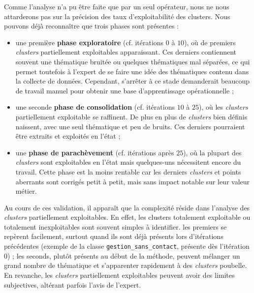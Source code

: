 			Comme l'analyse n'a pu être faite que par un seul opérateur, nous ne nous attarderons pas sur la précision des taux d'exploitabilité des clusters.
			Nous pouvons déjà reconnaître que trois phases sont présentes :
			\begin{itemize}
				\item une première \textbf{phase exploratoire} (cf. itérations $0$ à $10$), où de premiers \textit{clusters} partiellement exploitables apparaissant.
				Ces derniers contiennent souvent une thématique bruitée ou quelques thématiques mal séparées, ce qui permet toutefois à l'expert de se faire une idée des thématiques contenu dans la collecte de données.
				Cependant, s'arrêter à ce stade demanderait beaucoup de travail manuel pour obtenir une base d'apprentissage opérationnelle ;
				\item une seconde \textbf{phase de consolidation} (cf. itérations $10$ à $25$), où les \textit{clusters} partiellement exploitable se raffinent.
				De plus en plus de \textit{clusters} bien définis naissent, avec une seul thématique et peu de bruits.
				Ces derniers pourraient être extraits et exploités en l'état ;
				\item une \textbf{phase de parachèvement} (cf. itérations après $25$), où la plupart des \textit{clusters} sont exploitables en l'état mais quelques-uns nécessitent encore du travail.
				Cette phase est la moins rentable car les derniers \textit{clusters} et points aberrants sont corrigés petit à petit, mais sans impact notable sur leur valeur métier. 
			\end{itemize}
			
			Au cours de ces validation, il apparaît que la complexité réside dans l'analyse des \textit{clusters} partiellement exploitables.
			En effet, les clusters totalement exploitable ou totalement inexploitables sont souvent simples à identifier.
			les premiers se repèrent facilement, surtout quand ils sont déjà présents lors d'itérations précédentes (exemple de la classe \texttt{gestion\_sans\_contact}, présente dès l'itération $0$) ;
			les seconds, plutôt présents au début de la méthode, peuvent mélanger un grand nombre de thématique et s'apparenter rapidement à des \textit{clusters} poubelle.
			En revanche, les \textit{clusters} partiellement exploitables peuvent avoir des limites subjectives, altérant parfois l'avis de l'expert.
			
